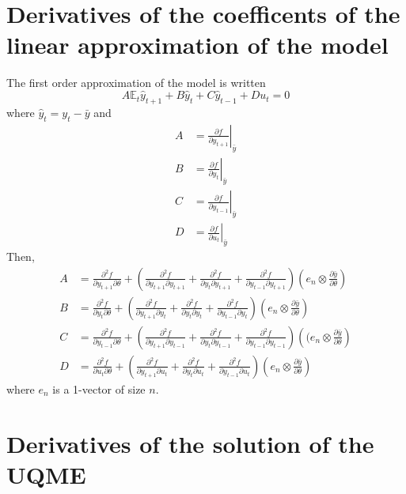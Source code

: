 \documentclass{article}
\begin{document}
\section{Derivatives of the coefficents of the linear
  approximation of the model}  
The first order approximation of the model is written
\[
A \mathbb{E}_t\hat y_{t+1} + B \hat y_t + C \hat y_{t-1} + Du_t = 0
\]
where $\hat y_t=y_t - \bar y$ and
\begin{align*}
  A &= \left.\frac{\partial f}{\partial y_{t+1}} \right|_{\bar y}\\
  B &= \left.\frac{\partial f}{\partial y_t} \right|_{\bar y}\\
  C &= \left.\frac{\partial f}{\partial y_{t-1}} \right|_{\bar y}\\
  D &= \left.\frac{\partial f}{\partial u_t} \right|_{\bar y}
\end{align*}
Then,
\begin{align*}
  A &= \frac{\partial^2 f}{\partial y_{t+1}\partial \theta} + \left(\frac{\partial^2
  f}{\partial y_{t+1}\partial y_{t+1}} +\frac{\partial^2 f}{\partial y_t\partial y_{t+1}} + \frac{\partial^2
      f}{\partial y_{t-1}\partial y_{t+1}}\right)\left(e_n\otimes \frac{\partial \bar
    y}{\partial \theta}\right)\\ 
  B &= \frac{\partial^2 f}{\partial y_t\partial \theta} + \left(\frac{\partial^2
  f}{\partial y_{t+1}\partial y_t} +\frac{\partial^2 f}{\partial y_t\partial y_t} + \frac{\partial^2
      f}{\partial y_{t-1}\partial y_t}\right)\left(e_n\otimes \frac{\partial \bar
    y}{\partial \theta}\right)\\ 
  C &= \frac{\partial^2 f}{\partial y_{t-1}\partial \theta} + \left(\frac{\partial^2
  f}{\partial y_{t+1}\partial y_{t-1}} +\frac{\partial^2 f}{\partial y_t\partial y_{t-1}} + \frac{\partial^2
      f}{\partial y_{t-1}\partial y_{t-1}}\right)\left((e_n\otimes \frac{\partial \bar
    y}{\partial \theta}\right)\\ 
  D &= \frac{\partial^2 f}{\partial u_t\partial \theta} + \left(\frac{\partial^2
  f}{\partial y_{t+1}\partial u_t} +\frac{\partial^2 f}{\partial y_t\partial u_t} + \frac{\partial^2
      f}{\partial y_{t-1}\partial u_t}\right)\left(e_n\otimes \frac{\partial \bar
    y}{\partial \theta}\right)
\end{align*}
where $e_n$ is a 1-vector of size $n$.
\section{Derivatives of the solution of the UQME}
\end{document}
